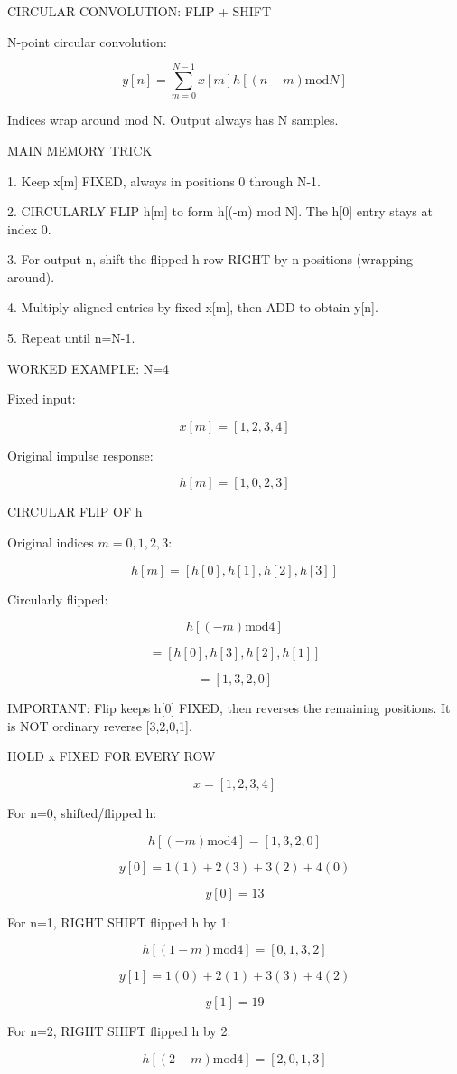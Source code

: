 CIRCULAR CONVOLUTION: FLIP + SHIFT

N-point circular convolution:

$$y[n]=\sum_{m=0}^{N-1}x[m]h[(n-m)\text{mod} N]$$

Indices wrap around mod N. Output always has N samples.

MAIN MEMORY TRICK

1. Keep x[m] FIXED, always in positions 0 through N-1.

2. CIRCULARLY FLIP h[m] to form h[(-m) mod N]. The h[0] entry stays at index 0.

3. For output n, shift the flipped h row RIGHT by n positions (wrapping around).

4. Multiply aligned entries by fixed x[m], then ADD to obtain y[n].

5. Repeat until n=N-1.

WORKED EXAMPLE: N=4

Fixed input:

$$x[m]=[1,2,3,4]$$

Original impulse response:

$$h[m]=[1,0,2,3]$$

CIRCULAR FLIP OF h

Original indices $m=0,1,2,3$:

$$h[m]=[h[0],h[1],h[2],h[3]]$$

Circularly flipped:

$$h[(-m)\text{mod}4]$$

$$=[h[0],h[3],h[2],h[1]]$$

$$=[1,3,2,0]$$

IMPORTANT: Flip keeps h[0] FIXED, then reverses the remaining positions. It is NOT ordinary reverse [3,2,0,1].

HOLD x FIXED FOR EVERY ROW

$$x=[1,2,3,4]$$

For n=0, shifted/flipped h:

$$h[(-m)\text{mod}4]=[1,3,2,0]$$

$$y[0]=1(1)+2(3)+3(2)+4(0)$$

$$y[0]=13$$

For n=1, RIGHT SHIFT flipped h by 1:

$$h[(1-m)\text{mod}4]=[0,1,3,2]$$

$$y[1]=1(0)+2(1)+3(3)+4(2)$$

$$y[1]=19$$

For n=2, RIGHT SHIFT flipped h by 2:

$$h[(2-m)\text{mod}4]=[2,0,1,3]$$

